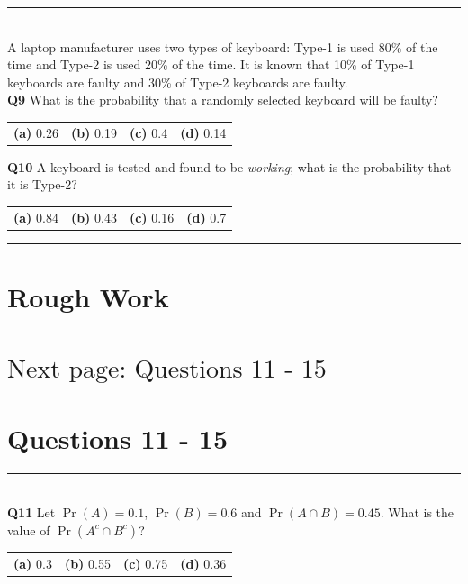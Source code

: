 \documentclass[12pt]{article}
\begin{document}
\rule{\linewidth}{1pt}
\quad\\
A laptop manufacturer uses two types of keyboard: Type-1 is used 80\% of the time and Type-2 is used 20\% of the time. It is known that 10\% of Type-1 keyboards are faulty and 30\% of Type-2 keyboards are faulty.\\[0.3cm]


{\bf Q9} What is the probability that a randomly selected keyboard will be faulty?\\[0.2cm]
\begin{tabular}{cccc}
{\bf(a)} 0.26 & {\bf(b)} 0.19 & {\bf(c)} 0.4 & {\bf(d)} 0.14 \\[0.6cm]
\end{tabular}

{\bf Q10} A keyboard is tested and found to be \emph{working}; what is the probability that it is Type-2?\\[0.2cm]
\begin{tabular}{cccc}
{\bf(a)} 0.84 & {\bf(b)} 0.43 & {\bf(c)} 0.16 & {\bf(d)} 0.7 \\[0.6cm]
\end{tabular}


\rule{\linewidth}{1pt}

\newpage

\section*{Rough Work\\[23cm]}
\section*{\hspace{8cm}$\boxed{\text{Next page: Questions 11 - 15}}$}

\newpage

\section*{Questions 11 - 15}


\rule{\linewidth}{1pt}
\quad\\
{\bf Q11} Let $\Pr(A) = 0.1$, $\Pr(B) = 0.6$ and $\Pr(A \cap B) = 0.45$. What is the value of $\Pr(A^c \cap B^c)$? \\[0.2cm]
\begin{tabular}{cccc}
{\bf(a)} 0.3 & {\bf(b)} 0.55  & {\bf(c)} 0.75  & {\bf(d)} 0.36 \\[0.6cm]
\end{tabular}
\end{document}
